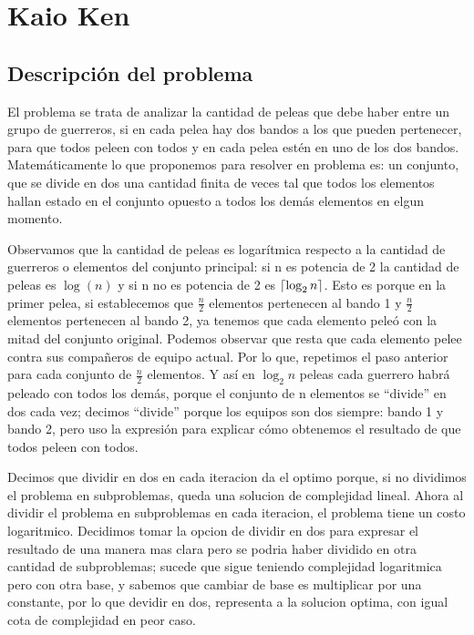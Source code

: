 \documentclass[10pt,a4paper]{article}
\DeclarePairedDelimiter\ceil{\lceil}{\rceil}
\begin{document}

\section{Kaio Ken}

\subsection{Descripción del problema}
\par{El problema se trata de analizar la cantidad de peleas que debe haber entre un grupo de
guerreros, si en cada pelea hay dos bandos a los que pueden pertenecer, para que todos
peleen con todos y en cada pelea estén en uno de los dos bandos. Matemáticamente lo que
proponemos para resolver en problema es: un conjunto, que se divide en dos una cantidad
finita de veces tal que todos los elementos hallan estado en el conjunto opuesto a todos
los demás elementos en elgun momento.}
\par{Observamos que la cantidad de peleas es logarítmica respecto a la cantidad de guerreros o elementos del conjunto principal: si n es potencia de 2 la cantidad de peleas es $\log(n)$ y si n no es potencia de 2 es $\ceil*{\log_2 n}$. Esto es porque en la primer pelea, si establecemos que $\frac{n}{2}$ elementos pertenecen al bando 1 y $\frac{n}{2}$ elementos pertenecen al bando 2, ya tenemos que cada elemento peleó con la mitad del conjunto original. Podemos observar que resta que cada elemento pelee contra sus compañeros de equipo actual. Por lo que, repetimos el paso anterior para cada conjunto de $\frac{n}{2}$ elementos. Y así en $\log_2 n$ peleas cada guerrero habrá peleado con todos los demás, porque el conjunto de n elementos se “divide” en dos cada vez; decimos “divide” porque los equipos son dos siempre: bando 1 y bando 2, pero uso la expresión para explicar cómo obtenemos el resultado de que todos peleen con todos.}
\par{Decimos que dividir en dos en cada iteracion da el optimo porque, si no dividimos el problema en subproblemas, queda una solucion de complejidad lineal. Ahora al dividir el problema en subproblemas en cada iteracion, el problema tiene un costo logaritmico. Decidimos tomar la opcion de dividir en dos para expresar el resultado de una manera mas clara pero se podria haber dividido en otra cantidad de subproblemas; sucede que sigue teniendo complejidad logaritmica pero con otra base, y sabemos que cambiar de base es multiplicar por una constante, por lo que devidir en dos, representa a la solucion optima, con igual cota de complejidad en peor caso.}
\end{document}
